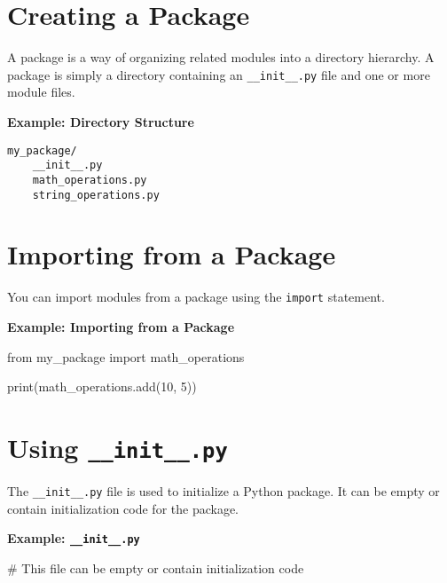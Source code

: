 \documentclass[
  letterpaper,
  DIV=11,
  numbers=noendperiod]{scrreprt}
\newenvironment{Shaded}{\begin{snugshade}}{\end{snugshade}}
\newcommand{\BuiltInTok}[1]{\textcolor[rgb]{0.00,0.23,0.31}{#1}}
\newcommand{\CommentTok}[1]{\textcolor[rgb]{0.37,0.37,0.37}{#1}}
\newcommand{\DecValTok}[1]{\textcolor[rgb]{0.68,0.00,0.00}{#1}}
\newcommand{\ImportTok}[1]{\textcolor[rgb]{0.00,0.46,0.62}{#1}}
\newcommand{\NormalTok}[1]{\textcolor[rgb]{0.00,0.23,0.31}{#1}}
\begin{document}
\section{Creating a Package}\label{creating-a-package}

A package is a way of organizing related modules into a directory
hierarchy. A package is simply a directory containing an
\texttt{\_\_init\_\_.py} file and one or more module files.

\textbf{Example: Directory Structure}

\begin{verbatim}
my_package/
    __init__.py
    math_operations.py
    string_operations.py
\end{verbatim}

\section{Importing from a Package}\label{importing-from-a-package}

You can import modules from a package using the \texttt{import}
statement.

\textbf{Example: Importing from a Package}

\begin{Shaded}
\begin{Highlighting}[]
\ImportTok{from}\NormalTok{ my\_package }\ImportTok{import}\NormalTok{ math\_operations}

\BuiltInTok{print}\NormalTok{(math\_operations.add(}\DecValTok{10}\NormalTok{, }\DecValTok{5}\NormalTok{))}
\end{Highlighting}
\end{Shaded}

\section{\texorpdfstring{Using
\texttt{\_\_init\_\_.py}}{Using \_\_init\_\_.py}}\label{using-__init__.py}

The \texttt{\_\_init\_\_.py} file is used to initialize a Python
package. It can be empty or contain initialization code for the package.

\textbf{Example: \texttt{\_\_init\_\_.py}}

\begin{Shaded}
\begin{Highlighting}[]
\CommentTok{\# This file can be empty or contain initialization code}
\end{Highlighting}
\end{Shaded}
\end{document}
